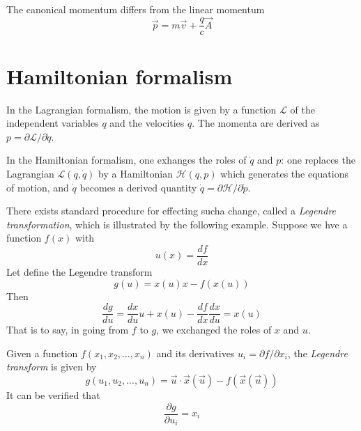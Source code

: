 \documentclass[11pt,fleqn]{book} %
\begin{document}
\begin{remark}
    The canonical momentum differs from the linear momentum
    \begin{equation}
        \label{eq:em_p}
        \vec{p}=m\vec{v}+\frac{q}{c}\vec{A}
    \end{equation}    
\end{remark}

\section{Hamiltonian formalism}
In the Lagrangian formalism, the motion is given by a function $\mathcal{L}$ of the independent variables $q$ and the velocities $\dot q$.
The momenta are derived as $p=\partial\mathcal{L}/\partial\dot q$.

In the Hamiltonian formalism, one exhanges the roles of $\dot q$ and $p$: one replaces the Lagrangian $\mathcal{L}(q,\dot q)$ by a 
Hamiltonian $\mathcal{H}(q,p)$ which generates the equations of motion, and $\dot q$ becomes a derived quantity
$\dot q=\partial\mathcal{H}/\partial\dot p$.

There exists  standard procedure for effecting sucha change, called a \textit{Legendre transformation}, which is illustrated by the 
following example. Suppose we hve a function $f(x)$ with
\begin{equation*}
    u(x) = \frac{df}{dx}
\end{equation*}
Let define the Legendre transform
\begin{equation*}
    g(u)=x(u)x-f(x(u))
\end{equation*}
Then
\begin{equation*}
    \frac{dg}{du} = \frac{dx}{du}u+x(u)-\frac{df}{dx}\frac{dx}{du}=x(u)
\end{equation*}
That is to say, in going from $f$ to $g$, we exchanged the roles of $x$ and $u$.

\begin{definition}
    Given a function $f(x_1,x_2,...,x_n)$ and its derivatives $u_i=\partial f/\partial x_i$, 
    the \textit{Legendre transform} is given by
    \begin{equation*}
        g(u_1,u_2,...,u_n)=\vec{u}\cdot \vec{x}(\vec{u}) - f(\vec{x}(\vec{u}))
    \end{equation*}
    It can be verified that 
    \begin{equation*}
        \frac{\partial g}{\partial u_i}=x_i
    \end{equation*}
\end{definition}
\end{document}
